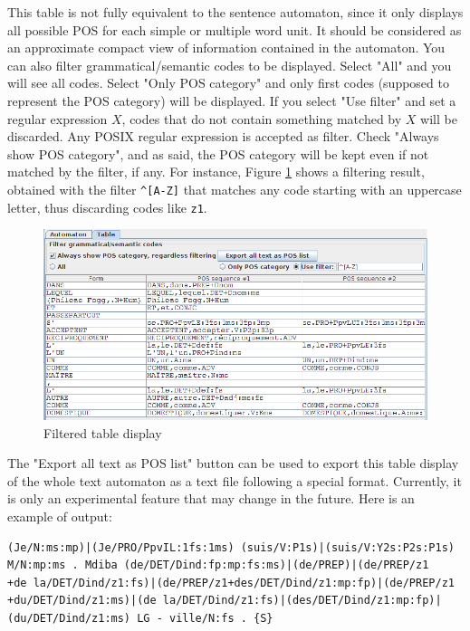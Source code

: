 \bigskip
\noindent This table is not fully equivalent to the sentence automaton, since it only
displays all possible POS for each simple or multiple word unit. It should be considered
as an approximate compact view of information contained in the automaton. You can also filter
grammatical/semantic codes to be displayed. Select "All" and you will see all codes. Select
"Only POS category" and only first codes (supposed to represent the POS category) will be displayed.
If you select "Use filter" and set a regular expression $X$, codes that do not contain something 
matched by $X$ will be discarded. Any POSIX regular expression is accepted as filter. Check 
"Always show POS category", and as said, the POS category will be kept even if not matched by the filter,
if any. For instance, Figure \ref{fig7-table2} shows a filtering result, obtained with the filter
\verb+^[A-Z]+ that matches any code starting with an uppercase letter, thus discarding codes like
\verb+z1+.

\begin{figure}[!ht]
\begin{center}
\includegraphics[width=14.5cm]{resources/img/fig7-table2.png}
\caption{Filtered table display\label{fig7-table2}}
\end{center}
\end{figure}
      
\bigskip
\noindent The "Export all text as POS list" button can be used to export this table display
of the whole text automaton as a text file following a special format. Currently, it is
only an experimental feature that may change in the future. Here is an example of output:

\begin{verbatim}
(Je/N:ms:mp)|(Je/PRO/PpvIL:1fs:1ms) (suis/V:P1s)|(suis/V:Y2s:P2s:P1s) 
M/N:mp:ms . Mdiba (de/DET/Dind:fp:mp:fs:ms)|(de/PREP)|(de/PREP/z1
+de la/DET/Dind/z1:fs)|(de/PREP/z1+des/DET/Dind/z1:mp:fp)|(de/PREP/z1
+du/DET/Dind/z1:ms)|(de la/DET/Dind/z1:fs)|(des/DET/Dind/z1:mp:fp)|
(du/DET/Dind/z1:ms) LG - ville/N:fs . {S}
\end{verbatim}



